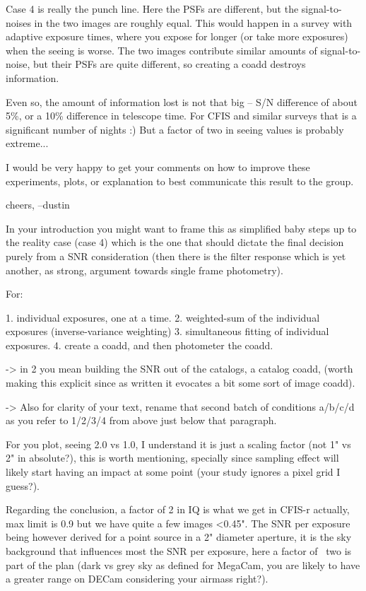 \documentclass[letter,11pt]{article}
\begin{document}
Case 4 is really the punch line.  Here the PSFs are different, but the signal-to-noises in the two images are roughly equal.  This would happen in a survey with adaptive exposure times, where you expose for longer (or take more exposures) when the seeing is worse.  The two images contribute similar amounts of signal-to-noise, but their PSFs are quite different, so creating a coadd destroys information.

Even so, the amount of information lost is not that big -- S/N difference of about 5\%, or a 10\% difference in telescope time.  For CFIS and similar surveys that is a significant number of nights :)  But a factor of two in seeing values is probably extreme...


I would be very happy to get your comments on how to improve these experiments, plots, or explanation to best communicate this result to the group.

cheers,
--dustin



In your introduction you might want to frame this as simplified baby steps up to the reality case (case 4) which is the one that should dictate the final decision purely from a SNR consideration (then there is the filter response which is yet another, as strong, argument towards single frame photometry).

For:

1. individual exposures, one at a time.
2. weighted-sum of the individual exposures (inverse-variance weighting)
3. simultaneous fitting of individual exposures.
4. create a coadd, and then photometer the coadd.

-> in 2 you mean building the SNR out of the catalogs, a catalog coadd, (worth making this explicit since as written it evocates a bit some sort of image coadd).

-> Also for clarity of your text, rename that second batch of conditions a/b/c/d as you refer to 1/2/3/4 from above just below that paragraph.

For you plot, seeing 2.0 vs 1.0, I understand it is just a scaling factor (not 1" vs 2" in absolute?), this is worth mentioning, specially since sampling effect will likely start having an impact at some point (your study ignores a pixel grid I guess?).

Regarding the conclusion, a factor of 2 in IQ is what we get in CFIS-r actually, max limit is 0.9 but we have quite a few images <0.45". The SNR per exposure being however derived for a point source in a 2" diameter aperture, it is the sky background that influences most the SNR per exposure, here a factor of ~two is part of the plan (dark vs grey sky as defined for MegaCam, you are likely to have a greater range on DECam considering your airmass right?).
\end{document}
